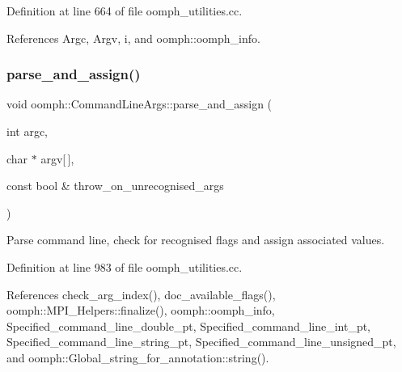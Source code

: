 Definition at line 664 of file oomph\+\_\+utilities.\+cc.



References Argc, Argv, i, and oomph\+::oomph\+\_\+info.

\mbox{\label{namespaceoomph_1_1CommandLineArgs_a8fee7d9c4bee7cec9121075c1a0dc341}} 
\subsubsection{\texorpdfstring{parse\+\_\+and\+\_\+assign()}{parse\_and\_assign()}\hspace{0.1cm}{\footnotesize\ttfamily [1/2]}}
{\footnotesize\ttfamily void oomph\+::\+Command\+Line\+Args\+::parse\+\_\+and\+\_\+assign (\begin{DoxyParamCaption}\item[{int}]{argc,  }\item[{char $\ast$}]{argv\mbox{[}$\,$\mbox{]},  }\item[{const bool \&}]{throw\+\_\+on\+\_\+unrecognised\+\_\+args }\end{DoxyParamCaption})}



Parse command line, check for recognised flags and assign associated values. 



Definition at line 983 of file oomph\+\_\+utilities.\+cc.



References check\+\_\+arg\+\_\+index(), doc\+\_\+available\+\_\+flags(), oomph\+::\+M\+P\+I\+\_\+\+Helpers\+::finalize(), oomph\+::oomph\+\_\+info, Specified\+\_\+command\+\_\+line\+\_\+double\+\_\+pt, Specified\+\_\+command\+\_\+line\+\_\+int\+\_\+pt, Specified\+\_\+command\+\_\+line\+\_\+string\+\_\+pt, Specified\+\_\+command\+\_\+line\+\_\+unsigned\+\_\+pt, and oomph\+::\+Global\+\_\+string\+\_\+for\+\_\+annotation\+::string().

\mbox{\label{namespaceoomph_1_1CommandLineArgs_a541bf74c755c9d3f885d075151367e95}} 
